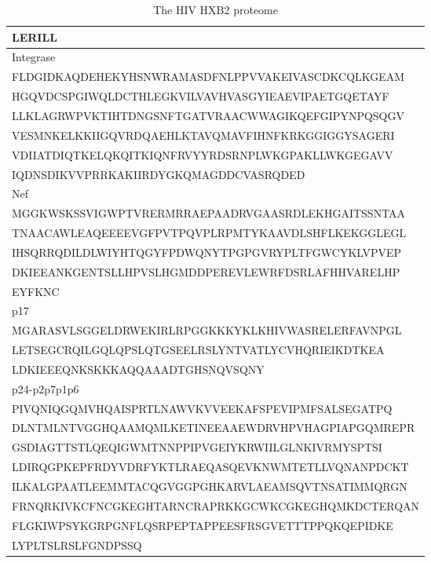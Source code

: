 \begin{table}[htp]
\begin{center}
\begin{tabulary}{\textwidth}{|L|}
LERILL \bigstrut[b] \\
\hline
Integrase \bigstrut[t] \\
FLDGIDKAQDEHEKYHSNWRAMASDFNLPPVVAKEIVASCDKCQLKGEAM \bigstrut[t] \\
HGQVDCSPGIWQLDCTHLEGKVILVAVHVASGYIEAEVIPAETGQETAYF \\
LLKLAGRWPVKTIHTDNGSNFTGATVRAACWWAGIKQEFGIPYNPQSQGV \\
VESMNKELKKIIGQVRDQAEHLKTAVQMAVFIHNFKRKGGIGGYSAGERI \\
VDIIATDIQTKELQKQITKIQNFRVYYRDSRNPLWKGPAKLLWKGEGAVV \\
IQDNSDIKVVPRRKAKIIRDYGKQMAGDDCVASRQDED \bigstrut[b] \\
\hline
Nef \bigstrut[t] \\
MGGKWSKSSVIGWPTVRERMRRAEPAADRVGAASRDLEKHGAITSSNTAA \bigstrut[t] \\ 
TNAACAWLEAQEEEEVGFPVTPQVPLRPMTYKAAVDLSHFLKEKGGLEGL \\
IHSQRRQDILDLWIYHTQGYFPDWQNYTPGPGVRYPLTFGWCYKLVPVEP \\
DKIEEANKGENTSLLHPVSLHGMDDPEREVLEWRFDSRLAFHHVARELHP \\
EYFKNC \bigstrut[b] \\
\hline
p17 \bigstrut[t] \\
MGARASVLSGGELDRWEKIRLRPGGKKKYKLKHIVWASRELERFAVNPGL \bigstrut[t] \\
LETSEGCRQILGQLQPSLQTGSEELRSLYNTVATLYCVHQRIEIKDTKEA \\
LDKIEEEQNKSKKKAQQAAADTGHSNQVSQNY \bigstrut[b] \\
\hline
p24-p2p7p1p6 \bigstrut[t] \\
PIVQNIQGQMVHQAISPRTLNAWVKVVEEKAFSPEVIPMFSALSEGATPQ \bigstrut[t] \\
DLNTMLNTVGGHQAAMQMLKETINEEAAEWDRVHPVHAGPIAPGQMREPR \\
GSDIAGTTSTLQEQIGWMTNNPPIPVGEIYKRWIILGLNKIVRMYSPTSI \\
LDIRQGPKEPFRDYVDRFYKTLRAEQASQEVKNWMTETLLVQNANPDCKT \\
ILKALGPAATLEEMMTACQGVGGPGHKARVLAEAMSQVTNSATIMMQRGN \\
FRNQRKIVKCFNCGKEGHTARNCRAPRKKGCWKCGKEGHQMKDCTERQAN \\
FLGKIWPSYKGRPGNFLQSRPEPTAPPEESFRSGVETTTPPQKQEPIDKE \\
LYPLTSLRSLFGNDPSSQ \bigstrut[b] \\
\hline
\end{tabulary}
\end{center}
\caption[The HIV HXB2 proteome]{The HIV HXB2 proteome}\label{appendixa/HXB2}
\end{table}


